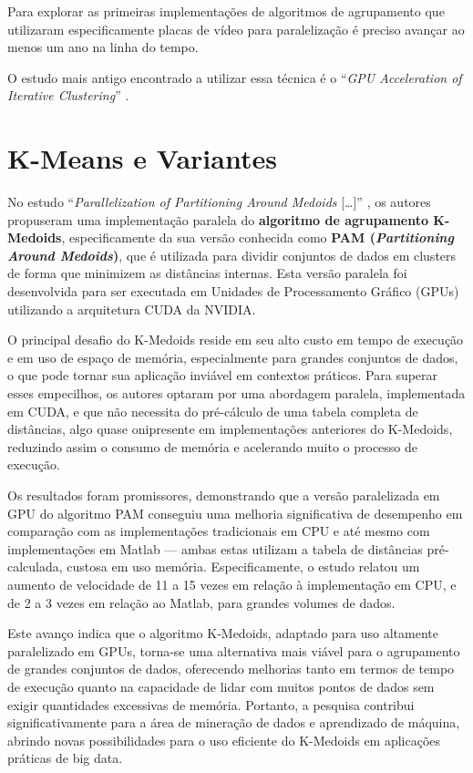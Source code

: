 \documentclass[12pt,
openright, 
oneside, %
a4paper,    %
brazil]{facom-ufu-abntex2}
\begin{document}
Para explorar as primeiras implementações de algoritmos de agrupamento que utilizaram especificamente placas de vídeo para paralelização é preciso avançar ao menos um ano na linha do tempo.

O estudo mais antigo encontrado a utilizar essa técnica é o \enquote{\textit{GPU Acceleration of Iterative Clustering}} \cite{iterativeClusteringGPU2004}.



\section{K-Means e Variantes}

No estudo \enquote{\textit{Parallelization of Partitioning Around Medoids} [\dots]} \cite{pamKMedoids2020}, os autores propuseram uma implementação paralela do \textbf{algoritmo de agrupamento K-Medoids}, especificamente da sua versão conhecida como \textbf{PAM (\textit{Partitioning Around Medoids})}, que é utilizada para dividir conjuntos de dados em clusters de forma que minimizem as distâncias internas. Esta versão paralela foi desenvolvida para ser executada em Unidades de Processamento Gráfico (GPUs) utilizando a arquitetura CUDA da NVIDIA.

O principal desafio do K-Medoids reside em seu alto custo em tempo de execução e em uso de espaço de memória, especialmente para grandes conjuntos de dados, o que pode tornar sua aplicação inviável em contextos práticos. Para superar esses empecilhos, os autores optaram por uma abordagem paralela, implementada em CUDA, e que não necessita do pré-cálculo de uma tabela completa de distâncias, algo quase onipresente em implementações anteriores do K-Medoids, reduzindo assim o consumo de memória e acelerando muito o processo de execução.

Os resultados foram promissores, demonstrando que a versão paralelizada em GPU do algoritmo PAM conseguiu uma melhoria significativa de desempenho em comparação com as implementações tradicionais em CPU e até mesmo com implementações em Matlab --- ambas estas utilizam a tabela de distâncias pré-calculada, custosa em uso memória. Especificamente, o estudo relatou um aumento de velocidade de 11 a 15 vezes em relação à implementação em CPU, e de 2 a 3 vezes em relação ao Matlab, para grandes volumes de dados.

Este avanço indica que o algoritmo K-Medoids, adaptado para uso altamente paralelizado em GPUs, torna-se uma alternativa mais viável para o agrupamento de grandes conjuntos de dados, oferecendo melhorias tanto em termos de tempo de execução quanto na capacidade de lidar com muitos pontos de dados sem exigir quantidades excessivas de memória. Portanto, a pesquisa contribui significativamente para a área de mineração de dados e aprendizado de máquina, abrindo novas possibilidades para o uso eficiente do K-Medoids em aplicações práticas de big data.
\end{document}
